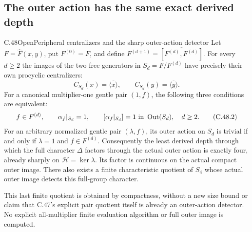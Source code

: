 \subsection{The outer action has the same exact derived depth}

\begin{statement}{C.48}{Open}{Peripheral centralizers and the sharp outer-action detector}
Let $F=\widehat F(x,y)$, put $F^{(0)}=F$, and define
$F^{(d+1)}=\overline{[F^{(d)},F^{(d)}]}$.
For every $d\geq2$ the images of the two free generators in
$S_d=F/F^{(d)}$ have precisely their own procyclic centralizers:
\[
 C_{S_d}(x)=\overline{\langle x\rangle},\qquad
 C_{S_d}(y)=\overline{\langle y\rangle}.                 \tag{C.48.1}
\]
For a canonical multiplier-one gentle pair $(1,f)$, the following
three conditions are equivalent:
\[
 f\in F^{(d)},\qquad
 \alpha_f|_{S_d}=1,\qquad
 [\alpha_f|_{S_d}]=1\ \hbox{in }\operatorname{Out}(S_d),
 \quad d\geq2.                                       \tag{C.48.2}
\]
For an arbitrary normalized gentle pair $(\lambda,f)$, its outer
action on $S_d$ is trivial if and only if $\lambda=1$ and
$f\in F^{(d)}$. Consequently the least derived depth through which
the full character $\Delta$ factors through the actual outer action
is exactly four, already sharply on $\mathcal H=\ker\lambda$.
Its factor is continuous on the actual compact outer image.
There also exists a finite characteristic quotient of $S_4$
whose actual outer image detects this full-group character.

This last finite quotient is obtained by compactness, without a
new size bound or claim that C.47's explicit pair quotient itself
is already an outer-action detector. No explicit all-multiplier
finite evaluation algorithm or full outer image is computed.
\end{statement}

